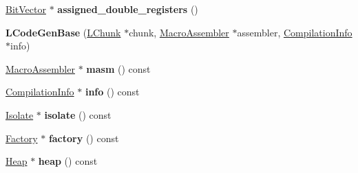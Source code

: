 \begin{DoxyCompactItemize}
\item 
\hyperlink{classv8_1_1internal_1_1_bit_vector}{Bit\+Vector} $\ast$ {\bfseries assigned\+\_\+double\+\_\+registers} ()\hypertarget{classv8_1_1internal_1_1_b_a_s_e___e_m_b_e_d_d_e_d_aa6e2ae478d5ed9c6f4c6c106386f1600}{}\label{classv8_1_1internal_1_1_b_a_s_e___e_m_b_e_d_d_e_d_aa6e2ae478d5ed9c6f4c6c106386f1600}

\item 
{\bfseries L\+Code\+Gen\+Base} (\hyperlink{classv8_1_1internal_1_1_l_chunk}{L\+Chunk} $\ast$chunk, \hyperlink{classv8_1_1internal_1_1_macro_assembler}{Macro\+Assembler} $\ast$assembler, \hyperlink{classv8_1_1internal_1_1_compilation_info}{Compilation\+Info} $\ast$info)\hypertarget{classv8_1_1internal_1_1_b_a_s_e___e_m_b_e_d_d_e_d_ae71803cbae8d75aca383d03d495c7f0b}{}\label{classv8_1_1internal_1_1_b_a_s_e___e_m_b_e_d_d_e_d_ae71803cbae8d75aca383d03d495c7f0b}

\item 
\hyperlink{classv8_1_1internal_1_1_macro_assembler}{Macro\+Assembler} $\ast$ {\bfseries masm} () const \hypertarget{classv8_1_1internal_1_1_b_a_s_e___e_m_b_e_d_d_e_d_aa3ff2602d4b06a3d074d4d9e005d22f5}{}\label{classv8_1_1internal_1_1_b_a_s_e___e_m_b_e_d_d_e_d_aa3ff2602d4b06a3d074d4d9e005d22f5}

\item 
\hyperlink{classv8_1_1internal_1_1_compilation_info}{Compilation\+Info} $\ast$ {\bfseries info} () const \hypertarget{classv8_1_1internal_1_1_b_a_s_e___e_m_b_e_d_d_e_d_aea2c1678ce70231a92e37e067c06615d}{}\label{classv8_1_1internal_1_1_b_a_s_e___e_m_b_e_d_d_e_d_aea2c1678ce70231a92e37e067c06615d}

\item 
\hyperlink{classv8_1_1internal_1_1_isolate}{Isolate} $\ast$ {\bfseries isolate} () const \hypertarget{classv8_1_1internal_1_1_b_a_s_e___e_m_b_e_d_d_e_d_a8fd23ecb465f23cd3c60deb9a7bde1f8}{}\label{classv8_1_1internal_1_1_b_a_s_e___e_m_b_e_d_d_e_d_a8fd23ecb465f23cd3c60deb9a7bde1f8}

\item 
\hyperlink{classv8_1_1internal_1_1_factory}{Factory} $\ast$ {\bfseries factory} () const \hypertarget{classv8_1_1internal_1_1_b_a_s_e___e_m_b_e_d_d_e_d_a4804ce35bf86e0493b7e814ceea0fb8f}{}\label{classv8_1_1internal_1_1_b_a_s_e___e_m_b_e_d_d_e_d_a4804ce35bf86e0493b7e814ceea0fb8f}

\item 
\hyperlink{classv8_1_1internal_1_1_heap}{Heap} $\ast$ {\bfseries heap} () const \hypertarget{classv8_1_1internal_1_1_b_a_s_e___e_m_b_e_d_d_e_d_a865b72138f670421743f29092f13ef22}{}\label{classv8_1_1internal_1_1_b_a_s_e___e_m_b_e_d_d_e_d_a865b72138f670421743f29092f13ef22}


\end{DoxyCompactItemize}
